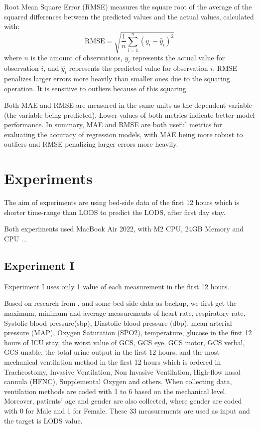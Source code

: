 \documentclass[12pt,a4paper,english
]{tunithesis}
\begin{document}
Root Mean Square Error (RMSE) measures the square root of the average of the squared differences between the predicted values and the actual values, calculated with: 
\begin{equation*}
    \mathrm{RMSE}=\sqrt{\frac{1}{n} \sum_{i=1}^n\left(y_i-\hat{y}_i\right)^2}
\end{equation*}
where $n$ is the amount of observations, $y_i$ represents the actual value for observation $i$, and $\hat{y}_i$ represents the predicted value for observation $i$. RMSE penalizes larger errors more heavily than smaller ones due to the squaring operation. It is sensitive to outliers because of this squaring

Both MAE and RMSE are measured in the same units as the dependent variable (the variable being predicted). Lower values of both metrics indicate better model performance. In summary, MAE and RMSE are both useful metrics for evaluating the accuracy of regression models, with MAE being more robust to outliers and RMSE penalizing larger errors more heavily.


\chapter{Experiments}
\label{ch:experiment}
The aim of experiments are using bed-side data of the first 12 hours which is shorter time-range than LODS to predict the LODS, after first day stay.

Both experiments used MacBook Air 2022, with M2 CPU, 24GB Memory and CPU ...

\section{Experiment I}
Experiment I uses only 1 value of each measurement in the first 12 hours. 

Based on research from \textcite{asuroglu2021, johnson2013}, and some bed-side data as backup, we first get the maximum, minimum and average measurements of heart rate, respiratory rate, Systolic blood pressure(sbp), Diastolic blood pressure (dbp), mean arterial pressure (MAP), Oxygen Saturation (SPO2), temperature, glucose in the first 12 hours of ICU stay, the worst value of GCS, GCS eye, GCS motor, GCS verbal, GCS unable, the total urine output in the first 12 hours, and the most mechanical ventilation method in the first 12 hours which is ordered in Tracheostomy, Invasive Ventilation, Non Invasive Ventilation, High-flow nasal cannula (HFNC), Supplemental Oxygen and others. When collecting data, ventilation methods are coded with 1 to 6 based on the mechanical level. Moreover, patients' age and gender are also collected, where gender are coded with 0 for Male and 1 for Female.  These 33 measurements are used as input and the target is LODS value. 
\end{document}
